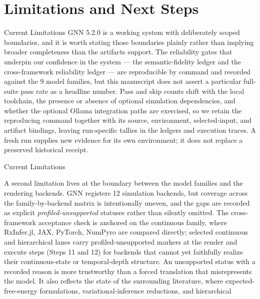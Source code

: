 \documentclass[
  ignorenonframetext,
]{beamer}
\author{\texorpdfstring{}{}}
\date{}
\begin{document}
\section{Limitations and Next Steps}\label{sec:limitations_next_steps}

\begin{frame}{Current Limitations}
\protect{}\label{current-limitations}
GNN 5.2.0 is a working system with deliberately scoped boundaries, and
it is worth stating those boundaries plainly rather than implying
broader completeness than the artifacts support. The reliability gates
that underpin our confidence in the system --- the semantic-fidelity
ledger and the cross-framework reliability ledger --- are reproducible
by command and recorded against the 9 model families, but this
manuscript does not assert a particular full-suite pass rate as a
headline number. Pass and skip counts shift with the local toolchain,
the presence or absence of optional simulation dependencies, and whether
the optional Ollama integration paths are exercised, so we retain the
reproducing command together with its source, environment,
selected-input, and artifact bindings, leaving run-specific tallies in
the ledgers and execution traces. A fresh run supplies new evidence for
its own environment; it does not replace a preserved historical receipt.
\end{frame}

\begin{frame}{Current Limitations}

A second limitation lives at the boundary between the model families and
the rendering backends. GNN registers 12 simulation backends, but
coverage across the family-by-backend matrix is intentionally uneven,
and the gaps are recorded as explicit \emph{profiled-unsupported}
statuses rather than silently omitted. The cross-framework acceptance
check is anchored on the continuous family, where RxInfer.jl, JAX,
PyTorch, NumPyro are compared directly; selected continuous and
hierarchical lanes carry profiled-unsupported markers at the render and
execute steps (Steps 11 and 12) for backends that cannot yet faithfully
realize their continuous-state or temporal-depth structure. An
unsupported status with a recorded reason is more trustworthy than a
forced translation that misrepresents the model. It also reflects the
state of the surrounding literature, where expected-free-energy
formulations, variational-inference reductions, and hierarchical
\end{frame}
\end{document}
